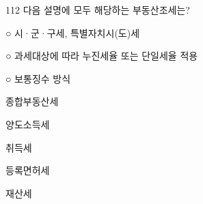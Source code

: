 \begin{question}{112}
다음 설명에 모두 해당하는 부동산조세는?
\begin{framedtext}
○ 시·군·구세, 특별자치시(도)세 \par
○ 과세대상에 따라 누진세율 또는 단일세율 적용 \par
○ 보통징수 방식
\end{framedtext}
\begin{choices}
  \item 종합부동산세
  \item 양도소득세
  \item 취득세
  \item 등록면허세
  \item 재산세
\end{choices}
\end{question}
